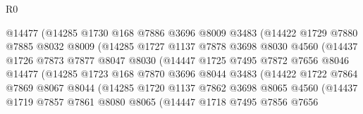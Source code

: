 \begin{lexlean}{R0}
\begin{coremodule}
                        @14477
                        (@14285
                          @1730
                          @168
                          @7886
                          @3696
                          @8009
                          @3483
                          (@14422
                            @1729
                            @7880
                            @7885
                            @8032
                            @8009
                            (@14285
                              @1727
                              @1137
                              @7878
                              @3698
                              @8030
                              @4560
                              (@14437
                                @1726
                                @7873
                                @7877
                                @8047
                                @8030
                                (@14447
                                  @1725
                                  @7495
                                  @7872
                                  @7656
                                  @8046
                                  @14477
                                  (@14285
                                    @1723
                                    @168
                                    @7870
                                    @3696
                                    @8044
                                    @3483
                                    (@14422
                                      @1722
                                      @7864
                                      @7869
                                      @8067
                                      @8044
                                      (@14285
                                        @1720
                                        @1137
                                        @7862
                                        @3698
                                        @8065
                                        @4560
                                        (@14437
                                          @1719
                                          @7857
                                          @7861
                                          @8080
                                          @8065
                                          (@14447
                                            @1718
                                            @7495
                                            @7856
                                            @7656

\end{coremodule}
\end{lexlean}
